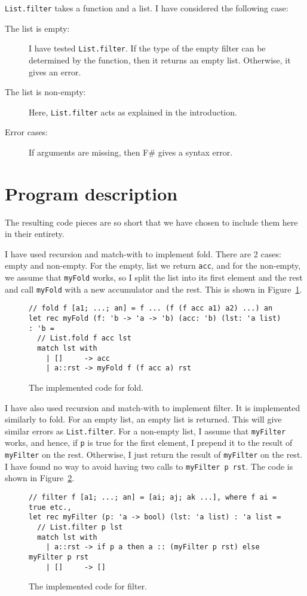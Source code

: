 \documentclass[a4paper]{article}
\begin{document}
\texttt{List.filter} takes a function and a list. I have considered the following case:
\begin{description}
\item[The list is empty:] I have tested \texttt{List.filter}. If the type of the empty filter can be determined by the function, then it returns an empty list. Otherwise, it gives an error.
\item[The list is non-empty:] Here, \texttt{List.filter} acts as explained in the introduction.
\item[Error cases:] If arguments are missing, then F\# gives a syntax error.
\end{description}

\section{Program description}
The resulting code pieces are so short that we have chosen to include them here in their entirety.

I have used recursion and match-with to implement fold. There are 2 cases: empty and non-empty. For the empty, list we return \texttt{acc}, and for the non-empty, we assume that \texttt{myFold} works, so I split the list into its first element and the rest and call \texttt{myFold} with a new accumulator and the rest. This is shown in Figure~\ref{fig:fold}.
\begin{figure}
  \lstset{language=FSharp}
\begin{lstlisting}
// fold f [a1; ...; an] = f ... (f (f acc a1) a2) ...) an
let rec myFold (f: 'b -> 'a -> 'b) (acc: 'b) (lst: 'a list) : 'b =
  // List.fold f acc lst
  match lst with
    | []     -> acc
    | a::rst -> myFold f (f acc a) rst
\end{lstlisting}
  \caption{The implemented code for fold.}
  \label{fig:fold}
\end{figure}

I have also used recursion and match-with to implement filter. It is
implemented similarly to fold. For an empty list, an empty list is
returned. This will give similar errors as \texttt{List.filter}. For a
non-empty list, I assume that \texttt{myFilter} works, and hence, if \texttt{p} is true for the first element, I prepend it to the result of \texttt{myFilter} on the rest. Otherwise, I just return the result of \texttt{myFilter} on the rest. I have found no way to avoid having two calls to \texttt{myFilter p rst}. The code is shown in Figure~\ref{fig:filter}.
\begin{figure}
  \lstset{language=FSharp}
\begin{lstlisting}
// filter f [a1; ...; an] = [ai; aj; ak ...], where f ai = true etc.,
let rec myFilter (p: 'a -> bool) (lst: 'a list) : 'a list =
  // List.filter p lst
  match lst with
    | a::rst -> if p a then a :: (myFilter p rst) else myFilter p rst
    | []     -> []
\end{lstlisting}
  \caption{The implemented code for filter.}
  \label{fig:filter}
\end{figure}
\end{document}
